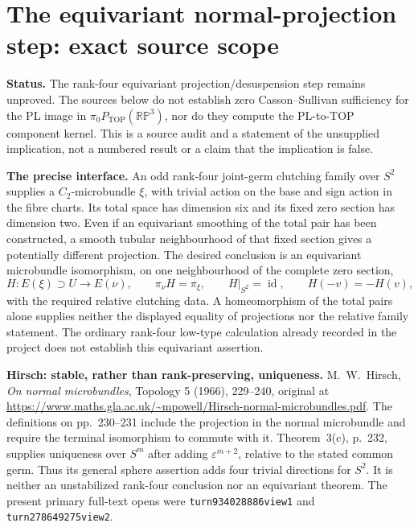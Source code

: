 \section*{The equivariant normal-projection step: exact source scope}

\textbf{Status.}\quad
The rank-four equivariant projection/desuspension step remains unproved.
The sources below do not establish zero Casson--Sullivan sufficiency for
the PL image in \(\pi_0P_{\mathrm{TOP}}(\mathbb{RP}^3)\), nor do they
compute the PL-to-TOP component kernel.  This is a source audit and a
statement of the unsupplied implication, not a numbered result or a
claim that the implication is false.

\textbf{The precise interface.}\quad
An odd rank-four joint-germ clutching family over \(S^2\) supplies a
\(C_2\)-microbundle \(\xi\), with trivial action on the base and sign
action in the fibre charts.  Its total space has dimension six and its
fixed zero section has dimension two.  Even if an equivariant smoothing
of the total pair has been constructed, a smooth tubular neighbourhood
of that fixed section gives a potentially different projection.
The desired conclusion is an equivariant microbundle isomorphism, on
one neighbourhood of the complete zero section,
\[
 H:E(\xi)\supset U\longrightarrow E(\nu),\qquad
 \pi_\nu H=\pi_\xi,\qquad H|_{S^2}=\operatorname{id},
 \qquad H(-v)=-H(v),
\]
with the required relative clutching data.  A homeomorphism of the total
pairs alone supplies neither the displayed equality of projections nor
the relative family statement.  The ordinary rank-four low-type
calculation already recorded in the project does not establish this
equivariant assertion.

\textbf{Hirsch: stable, rather than rank-preserving, uniqueness.}\quad
M.~W.~Hirsch, \emph{On normal microbundles}, Topology 5 (1966),
229--240, original at
\url{https://www.maths.gla.ac.uk/~mpowell/Hirsch-normal-microbundles.pdf}.
The definitions on pp.~230--231 include the projection in the normal
microbundle and require the terminal isomorphism to commute with it.
Theorem~3(c), p.~232, supplies uniqueness over \(S^m\) after adding
\(\varepsilon^{m+2}\), relative to the stated common germ.  Thus its
general sphere assertion adds four trivial directions for \(S^2\).
It is neither an unstabilized rank-four conclusion nor an equivariant
theorem.  The present primary full-text opens were
\texttt{turn934028886view1} and \texttt{turn278649275view2}.

